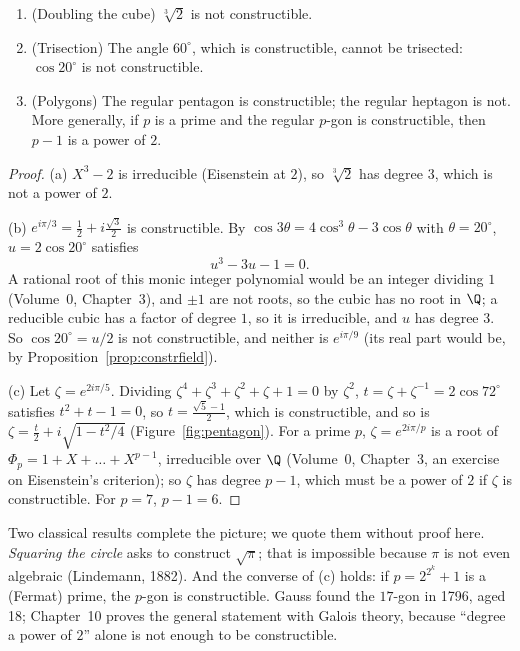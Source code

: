 \begin{corollary}\label{cor:classical}
\begin{enumerate}[label=(\alph*)]
\item (Doubling the cube) $\sqrt[3]2$ is not constructible.
\item (Trisection) The angle $60^\circ$, which is constructible, cannot be trisected: $\cos20^\circ$ is not constructible.
\item (Polygons) The regular pentagon is constructible; the regular heptagon is not. More generally, if $p$ is a prime and the regular $p$-gon is constructible, then $p-1$ is a power of $2$.
\end{enumerate}
\end{corollary}
\begin{proof}
(a) $X^3-2$ is irreducible (Eisenstein at $2$), so $\sqrt[3]2$ has degree $3$, which is not a power of $2$.

(b) $e^{i\pi/3}=\frac12+i\frac{\sqrt3}2$ is constructible. By $\cos3\theta=4\cos^3\theta-3\cos\theta$ with $\theta=20^\circ$, $u=2\cos20^\circ$ satisfies
\[
u^3-3u-1=0.
\]
A rational root of this monic integer polynomial would be an integer dividing $1$ (Volume~0, Chapter~3), and $\pm1$ are not roots, so the cubic has no root in $\Q$; a reducible cubic has a factor of degree $1$, so it is irreducible, and $u$ has degree $3$. So $\cos20^\circ=u/2$ is not constructible, and neither is $e^{i\pi/9}$ (its real part would be, by Proposition~\ref{prop:constrfield}).

(c) Let $\zeta=e^{2i\pi/5}$. Dividing $\zeta^4+\zeta^3+\zeta^2+\zeta+1=0$ by $\zeta^2$, $t=\zeta+\zeta^{-1}=2\cos72^\circ$ satisfies $t^2+t-1=0$, so $t=\frac{\sqrt5-1}2$, which is constructible, and so is $\zeta=\frac t2+i\sqrt{1-t^2/4}$ (Figure~\ref{fig:pentagon}). For a prime $p$, $\zeta=e^{2i\pi/p}$ is a root of $\Phi_p=1+X+\dots+X^{p-1}$, irreducible over $\Q$ (Volume~0, Chapter~3, an exercise on Eisenstein's criterion); so $\zeta$ has degree $p-1$, which must be a power of $2$ if $\zeta$ is constructible. For $p=7$, $p-1=6$.
\end{proof}

\begin{remark}
Two classical results complete the picture; we quote them without proof here. \emph{Squaring the circle} asks to construct $\sqrt\pi$; that is impossible because $\pi$ is not even algebraic (Lindemann, 1882). And the converse of (c) holds: if $p=2^{2^k}+1$ is a (Fermat) prime, the $p$-gon is constructible. Gauss found the $17$-gon in 1796, aged 18; Chapter~10 proves the general statement with Galois theory, because ``degree a power of $2$'' alone is not enough to be constructible.
\end{remark}

